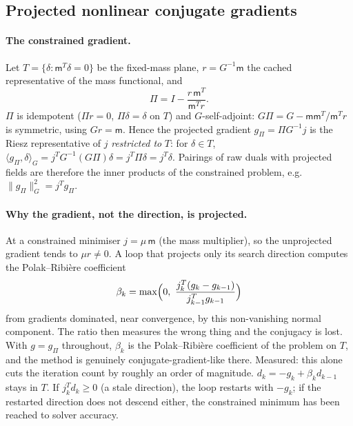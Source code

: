 \documentclass[11pt]{article}
\newcommand{\norm}[1]{\lVert #1 \rVert}
\newcommand{\ip}[2]{\langle #1, #2\rangle}
\begin{document}
\subsection{Projected nonlinear conjugate gradients}

\paragraph{The constrained gradient.} Let $T = \{\delta : \mathsf{m}^{T}\delta
= 0\}$ be the fixed-mass plane, $r = G^{-1}\mathsf{m}$ the cached
representative of the mass functional, and
\begin{equation}
  \Pi = I - \frac{r\,\mathsf{m}^{T}}{\mathsf{m}^{T}r} .
\end{equation}
$\Pi$ is idempotent ($\Pi r = 0$, $\Pi\delta = \delta$ on $T$) and
$G$-self-adjoint: $G\Pi = G - \mathsf{m}\mathsf{m}^{T}/\mathsf{m}^{T}r$ is
symmetric, using $Gr = \mathsf{m}$. Hence the projected gradient
$g_\Pi = \Pi G^{-1}j$ is the Riesz representative of $j$ \emph{restricted
to} $T$: for $\delta\in T$, $\ip{g_\Pi}{\delta}_G = j^{T}G^{-1}(G\Pi)\delta
= j^{T}\Pi\delta = j^{T}\delta$. Pairings of raw duals with projected
fields are therefore the inner products of the constrained problem, e.g.\
$\norm{g_\Pi}_G^2 = j^{T}g_\Pi$.

\paragraph{Why the gradient, not the direction, is projected.} At a
constrained minimiser $j = \mu\,\mathsf{m}$ (the mass multiplier), so the
unprojected gradient tends to $\mu r \ne 0$. A loop that projects only
its search direction computes the Polak--Ribi\`ere coefficient
\cite{PolakRibiere1969}
\begin{equation}
  \beta_k = \max\Bigl(0,\ \frac{j_k^{T}(g_k - g_{k-1})}{j_{k-1}^{T}g_{k-1}}\Bigr)
\end{equation}
from gradients dominated, near convergence, by this non-vanishing normal
component. The ratio then measures the wrong thing and the conjugacy is
lost. With $g = g_\Pi$ throughout, $\beta_k$ is the Polak--Ribi\`ere
coefficient of the problem on $T$, and the method is genuinely
conjugate-gradient-like there. Measured: this alone cuts the
iteration count by roughly an order of magnitude.
$d_k = -g_k + \beta_kd_{k-1}$ stays in $T$. If $j_k^{T}d_k \ge 0$ (a stale
direction), the loop restarts with $-g_k$; if the restarted direction does
not descend either, the constrained minimum has been reached to solver
accuracy.
\end{document}
